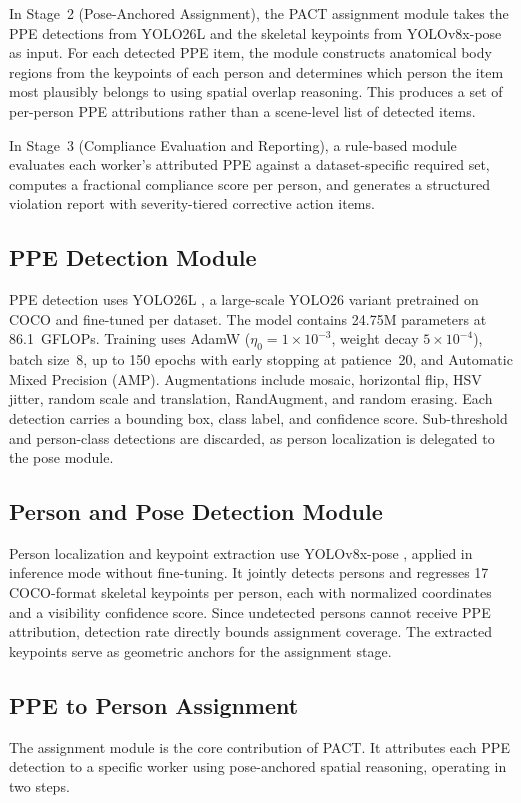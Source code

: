 \documentclass[conference,a4paper]{IEEEtran}
\begin{document}
In Stage~2 (Pose-Anchored Assignment), the PACT assignment module takes the PPE detections from YOLO26L and the skeletal keypoints from YOLOv8x-pose as input. For each detected PPE item, the module constructs anatomical body regions from the keypoints of each person and determines which person the item most plausibly belongs to using spatial overlap reasoning. This produces a set of per-person PPE attributions rather than a scene-level list of detected items.

In Stage~3 (Compliance Evaluation and Reporting), a rule-based module evaluates each worker's attributed PPE against a dataset-specific required set, computes a fractional compliance score per person, and generates a structured violation report with severity-tiered corrective action items.


\subsection{PPE Detection Module}
PPE detection uses YOLO26L \cite{sapkota_yolo26_2026}, a large-scale YOLO26 variant pretrained on COCO and fine-tuned per dataset. The model contains 24.75M parameters at 86.1~GFLOPs. Training uses AdamW ($\eta_0 = 1{\times}10^{-3}$, weight decay $5{\times}10^{-4}$), batch size~8, up to 150 epochs with early stopping at patience~20, and Automatic Mixed Precision (AMP). Augmentations include mosaic, horizontal flip, HSV jitter, random scale and translation, RandAugment, and random erasing. Each detection carries a bounding box, class label, and confidence score. Sub-threshold and person-class detections are discarded, as person localization is delegated to the pose module.


\subsection{Person and Pose Detection Module}
Person localization and keypoint extraction use YOLOv8x-pose \cite{yaseen_what_2024}, applied in inference mode without fine-tuning. It jointly detects persons and regresses 17 COCO-format skeletal keypoints per person, each with normalized coordinates and a visibility confidence score. Since undetected persons cannot receive PPE attribution, detection rate directly bounds assignment coverage. The extracted keypoints serve as geometric anchors for the assignment stage.


\subsection{PPE to Person Assignment}
The assignment module is the core contribution of PACT. It attributes each PPE detection to a specific worker using pose-anchored spatial reasoning, operating in two steps.
\end{document}
